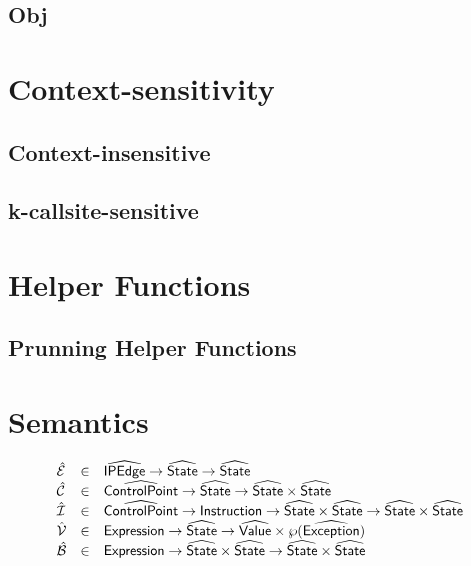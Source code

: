 \subsection{Obj}

\newpage
\section{Context-sensitivity}
\subsection{Context-insensitive}
\subsection{k-callsite-sensitive}

\newpage
\section{Helper Functions}

\subsection{Prunning Helper Functions}

\newpage
\section{Semantics}
\[
\begin{array}{lcl}
\aE & \in & \abs{IPEdge} \rightarrow \aState \rightarrow \aState \\
\aC & \in & \aControlPoint \rightarrow \aState \rightarrow \aState \times \aState\\
\aI & \in & \aControlPoint \rightarrow \SF{Instruction} 
    \rightarrow \aState \times \aState \rightarrow \aState \times \aState\\
\aV & \in & \SF{Expression} \rightarrow \aState 
    \rightarrow \aValue \times \powerset{\abs{Exception}} \\
\aB & \in & \SF{Expression} \rightarrow \aState \times \aState 
    \rightarrow \aState \times \aState\\
\end{array}
\]

